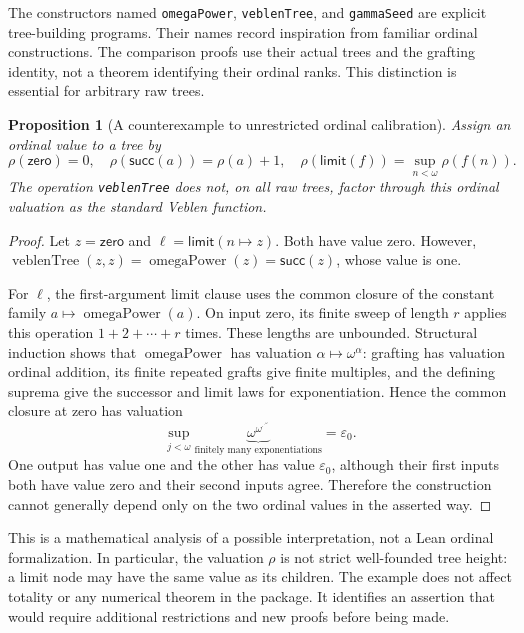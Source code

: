 \documentclass[11pt,letterpaper]{article}
\newtheorem{proposition}[theorem]{Proposition}
\theoremstyle{definition}
\newcommand{\code}[1]{\texttt{#1}}
\begin{document}
The constructors named \code{omegaPower}, \code{veblenTree}, and
\code{gammaSeed} are explicit tree-building programs. Their names record
inspiration from familiar ordinal constructions. The comparison proofs use
their actual trees and the grafting identity, not a theorem identifying their
ordinal ranks. This distinction is essential for arbitrary raw trees.

\begin{proposition}[A counterexample to unrestricted ordinal calibration]
\label{prop:ordinalcounter}
Assign an ordinal value to a tree by
\[
 \rho(\mathsf{zero})=0,\quad
 \rho(\mathsf{succ}(a))=\rho(a)+1,\quad
 \rho(\mathsf{limit}(f))=\sup_{n<\omega}\rho(f(n)).
\]
The operation \code{veblenTree} does not, on all raw trees, factor through
this ordinal valuation as the standard Veblen function.
\end{proposition}
\begin{proof}
Let \(z=\mathsf{zero}\) and
\(\ell=\mathsf{limit}(n\mapsto z)\). Both have value zero. However,
\(\operatorname{veblenTree}(z,z)=\operatorname{omegaPower}(z)
=\mathsf{succ}(z)\), whose value is one.

For \(\ell\), the first-argument limit clause uses the common closure of
the constant family \(a\mapsto\operatorname{omegaPower}(a)\).
On input zero, its finite sweep of length \(r\) applies this operation
\(1+2+\cdots+r\) times. These lengths are unbounded. Structural induction
shows that \(\operatorname{omegaPower}\) has valuation
\(\alpha\mapsto\omega^\alpha\): grafting has valuation ordinal addition,
its finite repeated grafts give finite multiples, and the defining suprema
give the successor and limit laws for exponentiation. Hence the common
closure at zero has valuation
\[
 \sup_{j<\omega}\underbrace{\omega^{\omega^{\cdot^{\cdot^\omega}}}}
 _{\text{finitely many exponentiations}}=\varepsilon_0.
\]
One output has value one and the other has value \(\varepsilon_0\), although
their first inputs both have value zero and their second inputs agree.
Therefore the construction cannot generally depend only on the two ordinal
values in the asserted way.
\end{proof}

This is a mathematical analysis of a possible interpretation, not a Lean
ordinal formalization. In particular, the valuation \(\rho\) is not strict
well-founded tree height: a limit node may have the same value as its children.
The example does not affect totality or any numerical theorem in the package.
It identifies an assertion that would require additional restrictions and new
proofs before being made.
\end{document}
